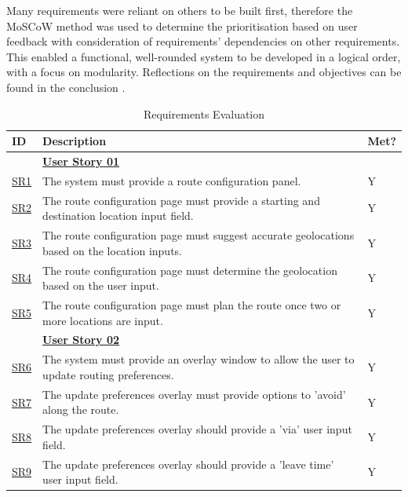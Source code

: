 Many requirements were reliant on others to be built first, therefore the MoSCoW method was used to determine the prioritisation based on user feedback with consideration of requirements' dependencies on other requirements. This enabled a functional, well-rounded system to be developed in a logical order, with a focus on modularity. Reflections on the requirements and objectives can be found in the conclusion .

\begingroup
\setlength{\tabcolsep}{10pt} %
\renewcommand{\arraystretch}{1.5} %
\begin{table}[!htb]
\caption{Requirements Evaluation}
\label{evaluatedrq}
\small
    \begin{tabularx}{\textwidth}{ p{1cm} p{11cm} p{1cm} }
        \hline
        ID & Description & Met? \\ 
        \hline
        & \textbf{\hyperref[tab:user-story-01]{User Story 01}} \\
        \hyperref[SR:1]{SR1} & The system must provide a route configuration panel. & Y\\
        \hyperref[SR:2]{SR2} & The route configuration page must provide a starting and destination location input field. & Y\\
        \hyperref[SR:3]{SR3} & The route configuration page must suggest accurate geolocations based on the location inputs.  & Y\\
        \hyperref[SR:4]{SR4} & The route configuration page must determine the geolocation based on the user input. & Y\\
        \hyperref[SR:5]{SR5} & The route configuration page must plan the route once two or more locations are input. & Y\\
        \hline
        & \textbf{\hyperref[tab:user-story-02]{User Story 02}}  \\
        \hyperref[SR:6]{SR6} & The system must provide an overlay window to allow the user to update routing preferences. & Y\\
        \hyperref[SR:7]{SR7} & The update preferences overlay must provide options to 'avoid' along the route. & Y\\
        \hyperref[SR:8]{SR8} & The update preferences overlay should provide a 'via' user input field. & Y\\ 
        \hyperref[SR:9]{SR9} & The update preferences overlay should provide a 'leave time' user input field. & Y\\ 

\end{tabularx}
\end{table}
